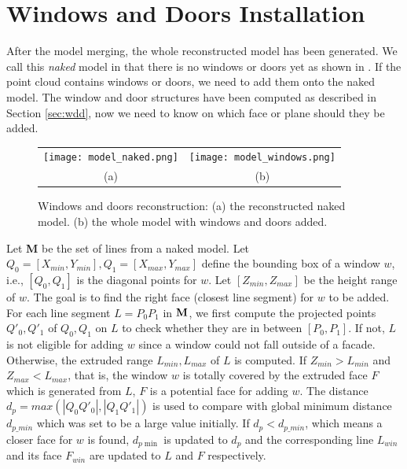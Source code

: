 \section{Windows and Doors Installation}

After the model merging, the whole reconstructed model has been generated. 
We call this {\it naked} model in that there is no windows or doors yet as shown in .
If the point cloud contains windows or doors, we need to add them onto the naked model.
The window and door structures have been computed as described in Section \ref{sec:wdd},
now we need to know on which face or plane should they be added.

\begin{figure} [htbp]
\begin{center}
\begin{tabular}{cc}
\texttt{[image: model\_naked.png]} &
\texttt{[image: model\_windows.png]} \\
(a) & (b) 
\end{tabular}
\end{center}
\caption{ Windows and doors reconstruction:
      (a) the reconstructed naked model.
      (b) the whole model with windows and doors added.}
\label{fig:WDR_Fig1}
\end{figure}

Let {\bf M} be the set of lines from a naked model.
Let $Q_0 = [X_{min}, Y_{min}], Q_1 = [X_{max}, Y_{max}]$ define the bounding box of a window $w$,
i.e., $[Q_0, Q_1]$ is the diagonal points for $w$.
Let $[Z_{min}, Z_{max}]$ be the height range of $w$.
The goal is to find the right face (closest line segment) for $w$ to be added.
For each line segment $L = P_0P_1 $ in ${\bf M}$, we first compute the projected points $Q'_0, Q'_1$
of $Q_0, Q_1$ on $L$ to check whether they are in between $[P_0, P_1]$. 
If not, $L$ is not eligible for adding $w$ since a window could not fall outside of a facade. 
Otherwise, the extruded range $L_{min}, L_{max}$ of $L$ is computed.
If $Z_{min} > L_{min}$ and $Z_{max} < L_{max}$, that is, the window $w$ is totally covered by the 
extruded face $F$ which is generated from $L$, $F$ is a potential face for adding $w$.
The distance $d_p = max(|Q_0Q'_0|, |Q_1Q'_1|)$ is used
to compare with global minimum distance $d_{p\_min}$ which was set to be a large value initially.
If $d_p < d_{p\_min}$, which means a closer face for $w$ is found, $d_{p\min}$ is updated to $d_p$ and
the corresponding line $L_{win}$ and its face $F_{win}$ are updated to $L$ and $F$ respectively. 

